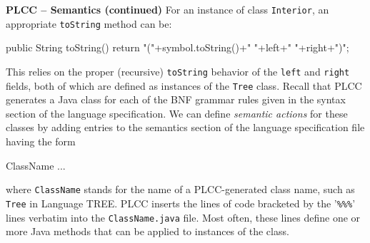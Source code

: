 \begin{minipage}[t]{\sw}
\slidenumber
\LARGE
{\bf PLCC -- Semantics (continued)}\exx
For an instance of class \verb'Interior',
an appropriate \verb'toString' method can be:
{\Large
\begin{qv}
public String toString() {
    return "("+symbol.toString()+" "+left+" "+right+")";
}
\end{qv}
}
This relies on the proper (recursive) \verb'toString' behavior
of the \verb'left' and \verb'right' fields,
both of which are defined as instances of the \verb'Tree' class.\exx
Recall that PLCC generates a Java class
for each of the BNF grammar rules
given in the syntax section of the language specification.
We can define {\em semantic actions} for these classes
by adding entries to the semantics section 
of the language specification file having the form
{\Large
\begin{qv}
ClassName
...
\end{qv}
}
where \verb'ClassName' stands for the name of a PLCC-generated class name,
such as \verb'Tree' in Language TREE.
PLCC inserts the lines of code bracketed by the '\verb'%%%'' lines
verbatim into the \verb'ClassName.java' file.
Most often, these lines define one or more Java methods
that can be applied to instances of the class.
\end{minipage}
\clearpage
